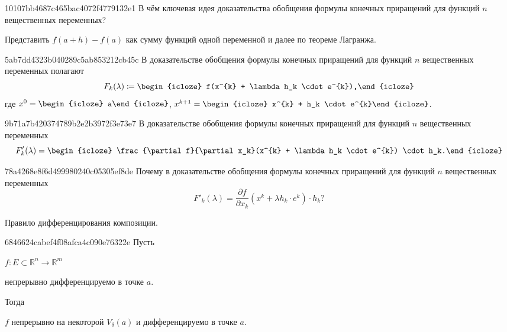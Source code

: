 \begin{note}{10107bb4687c465bac4072f4779132e1}
    В чём ключевая идея доказательства обобщения формулы конечных приращений для функций \({ n }\) вещественных переменных?

    \begin{cloze}{1}
        Представить \({ f(a + h) - f(a) }\) как сумму функций одной переменной и далее по теореме Лагранжа.
    \end{cloze}
\end{note}

\begin{note}{5ab7dd4323b040289c5ab853212cb45c}
    В доказательстве обобщения формулы конечных приращений для функций \({ n }\) вещественных переменных полагают
    \[
        F_k (\lambda) \coloneqq \begin{icloze}{2}f(x^{k} + \lambda h_k \cdot e^{k}),\end{icloze}
    \]
    где \({ x^{0} = \begin{icloze}{2}a\end{icloze} }\),\: \({ x^{k+1} = \begin{icloze}{2}x^{k} + h_k \cdot e^{k}\end{icloze} }\).
\end{note}

\begin{note}{9b71a7b420374789b2e2b3972f3e73e7}
    В доказательстве обобщения формулы конечных приращений для функций \({ n }\) вещественных переменных
    \[
        F'_k(\lambda) = \begin{icloze}{1}\frac{\partial f}{\partial x_k}(x^{k} + \lambda h_k \cdot e^{k}) \cdot h_k.\end{icloze}
    \]
\end{note}

\begin{note}{78a4268e8f6d499980240c05305ef8de}
    Почему в доказательстве обобщения формулы конечных приращений для функций \({ n }\) вещественных переменных
    \[
        F'_k(\lambda) = \frac{\partial f}{\partial x_k}(x^{k} + \lambda h_k \cdot e^{k}) \cdot h_k?
    \]

    \begin{cloze}{1}
        Правило дифференцирования композиции.
    \end{cloze}
\end{note}

\begin{note}{6846624cabef4f08afca4c090e76322e}
    Пусть \begin{icloze}{3}\({ f : E \subset \mathbb R^{n} \to \mathbb R^{m} }\)\end{icloze} \begin{icloze}{2}непрерывно дифференцируемо в точке \({ a }\).\end{icloze}
    Тогда \begin{icloze}{1}\({ f }\) непрерывно на некоторой \({ V_{\delta}(a) }\) и дифференцируемо в точке \({ a }\).\end{icloze}
\end{note}

